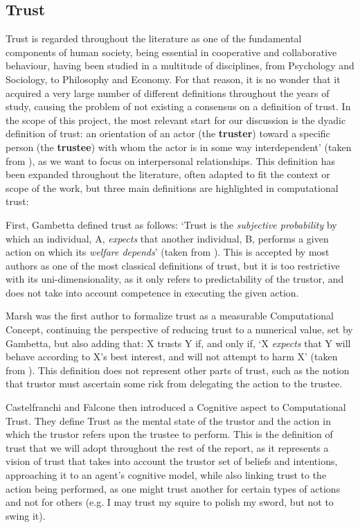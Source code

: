 \subsection{Trust}
\label{subsec:Trust}
Trust is regarded throughout the literature as one of the fundamental components of human society, being essential in cooperative and collaborative behaviour, having been studied in a multitude of disciplines, from Psychology and Sociology, to Philosophy and Economy\cite{Rousseau1998, Jones1997, Sabater2005}. For that reason, it is no wonder that it acquired a very large number of different definitions throughout the years of study, causing the problem of not existing a consensus on a definition of trust\cite{Castelfranchi2010}. In the scope of this project, the most relevant start for our discussion is the dyadic definition of trust: an orientation of an actor (the \textbf{truster}) toward a specific person (the \textbf{trustee}) with whom the actor is in some way interdependent' (taken from \cite{Simpson2007}), as we want to focus on interpersonal relationships. This definition has been expanded throughout the literature, often adapted to fit the context or scope of the work, but three main definitions are highlighted in computational trust:
\begin{itemize}
	\tallitem First, Gambetta\cite{Gambetta1988} defined trust as follows: `Trust is the \textit{subjective probability} by which an individual, A, \textit{expects} that another individual, B, performs a given action on which its \textit{welfare depends}' (taken from \cite{Castelfranchi2010}). This is accepted by most authors as one of the most classical definitions of trust, but it is too restrictive with its uni-dimensionality, as it only refers to predictability of the trustor, and does not take into account competence in executing the given action.
	
	\tallitem Marsh\cite{Marsh1994} was the first author to formalize trust as a measurable Computational Concept, continuing the perspective of reducing trust to a numerical value, set by Gambetta\cite{Gambetta1988}, but also adding that: X trusts Y if, and only if, `X \textit{expects} that Y will behave according to X's best interest, and will not attempt to harm X' (taken from \cite{Castelfranchi2010}). This definition does not represent other parts of trust, such as the notion that trustor must ascertain some risk from delegating the action to the trustee.
	
	\tallitem Castelfranchi and Falcone then introduced a Cognitive aspect to Computational Trust\cite{Castelfranchi1998}. They define Trust as the mental state of the trustor and the action in which the trustor refers upon the trustee to perform. This is the definition of trust that we will adopt throughout the rest of the report, as it represents a vision of trust that takes into account the trustor set of beliefs and intentions, approaching it to an agent's cognitive model, while also linking trust to the action being performed, as one might trust another for certain types of actions and not for others (e.g. I may trust my squire to polish my sword, but not to swing it).
\end{itemize}

